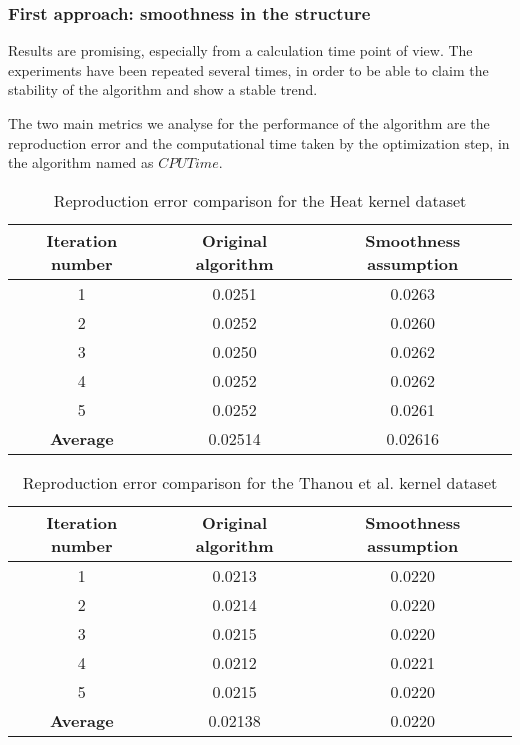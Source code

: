 \subsubsection{First approach: smoothness in the structure}
Results are promising, especially from a calculation time point of view. The experiments have been repeated several times, in order to be able to claim the stability of the algorithm and show a stable trend.

The two main metrics we analyse for the performance of the algorithm are the reproduction error and the computational time taken by the optimization step, in the algorithm named as $CPUTime$.

\begin{table}[htbp]
  \centering
  \begin{tabular}{c|c|c}
    \multicolumn{1}{c|}{\textbf{Iteration number}} &
    \multicolumn{1}{c}{\textbf{Original algorithm}} &
    \multicolumn{1}{|c}{\textbf{Smoothness assumption}}\\
    \hline
    1 & 0.0251 & 0.0263\\
    2 & 0.0252 & 0.0260\\
    3 & 0.0250 & 0.0262\\
    4 & 0.0252 & 0.0262\\
    5 & 0.0252 & 0.0261\\
    \textbf{Average} & 0.02514 & 0.02616\\
  \end{tabular}
  \caption{Reproduction error comparison for the Heat kernel dataset}
  \label{tab:errorHeat_struct}
\end{table}

\begin{table}[htbp]
  \centering
  \begin{tabular}{c|c|c}
    \multicolumn{1}{c|}{\textbf{Iteration number}} &
    \multicolumn{1}{c}{\textbf{Original algorithm}} &
    \multicolumn{1}{|c}{\textbf{Smoothness assumption}}\\
    \hline
    1 & 0.0213 & 0.0220\\
    2 & 0.0214 & 0.0220\\
    3 & 0.0215 & 0.0220\\
    4 & 0.0212 & 0.0221\\
    5 & 0.0215 & 0.0220\\
    \textbf{Average} & 0.02138 & 0.0220\\
  \end{tabular}
  \caption{Reproduction error comparison for the Thanou et al. kernel dataset}
  \label{tab:errorDorina_struct}
\end{table}

